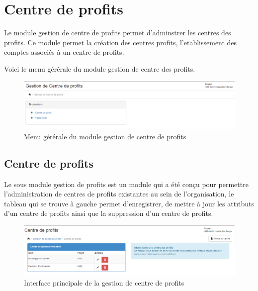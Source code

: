 \documentclass[12pt,a4paper]{report}
\begin{document}
\newpage
\section{Centre de profits}
Le module gestion de centre de profits permet d'adminstrer les centres des profits. Ce module permet la création des centres profits, l'etablissement des comptes associés à un centre de profits.

Voici le menu gérérale du module gestion de centre des profits.

\begin{figure}[h]
\begin{center}
\includegraphics[width=14cm]{pic/MenuProfitCenter.png}
\end{center}
\caption{Menu gérérale du module gestion de centre de profits}
\label{Menu gérérale du module gestion de centre de profits}
\end{figure}

\subsection{Centre de profits}
Le sous module gestion de profits est un module qui a été conçu pour permettre l'administration de centres de profits existantes au sein de l'organisation, le tableau qui se trouve à gauche permet d’enregistrer, de mettre à jour les attributs d'un centre de profits ainsi que la suppression d'un centre de profits.
\begin{figure}[h]
\begin{center}
\includegraphics[width=14cm]{pic/CentreProfitPage.png}
\end{center}
\caption{Interface principale de la gestion de centre de profits}
\label{Interface principale de la gestion de centre de profits}
\end{figure}
\end{document}
